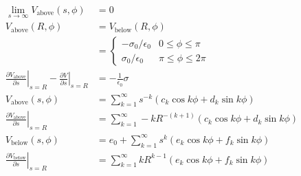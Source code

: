 \documentclass{article}
\begin{document}
\begin{align*}
  \lim_{s \rightarrow \infty} V_\text{above}(s, \phi)                                                                      & = 0                                                                       \\
  V_\text{above}(R, \phi)                                                                                                  & = V_\text{below}(R, \phi)                                                 \\
                                                                                                                           & = \begin{cases}
                                                                                                                                 -\sigma_0 / \epsilon_0 & 0 \le \phi \le \pi               \\
                                                                                                                                 \sigma_0 / \epsilon_0  & \pi \le \phi           \le 2 \pi
                                                                                                                               \end{cases}               \\
  \left. \frac{\partial V_\text{above}}{\partial s} \right|_{s = R} - \left. \frac{\partial V}{\partial s} \right|_{s = R} & = -\frac{1}{\epsilon_0} \sigma                                            \\
  V_\text{above}(s, \phi)                                                                                                  & = \sum_{k = 1}^\infty s^{-k} (c_k \cos k \phi + d_k \sin k \phi)          \\
  \left. \frac{\partial V_\text{above}}{\partial s} \right|_{s = R}                                                        & = \sum_{k = 1}^\infty -k R^{-(k + 1)} (c_k \cos k \phi + d_k \sin k \phi) \\
  V_\text{below}(s, \phi)                                                                                                  & = e_0 + \sum_{k = 1}^\infty s^k (e_k \cos k \phi + f_k \sin k \phi)       \\
  \left. \frac{\partial V_\text{below}}{\partial s} \right|_{s = R}                                                        & = \sum_{k = 1}^\infty k R^{k - 1} (e_k \cos k \phi + f_k \sin k \phi)     \\

\end{align*}
\end{document}

